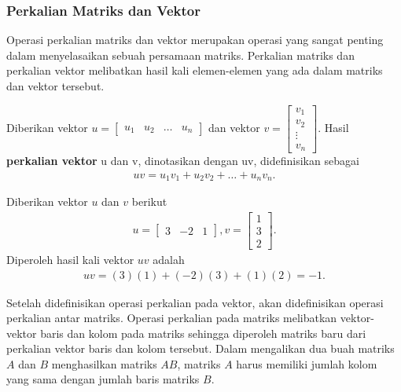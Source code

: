 \subsubsection{Perkalian Matriks dan Vektor}
Operasi perkalian matriks dan vektor merupakan operasi yang sangat penting dalam menyelasaikan sebuah persamaan matriks. Perkalian matriks dan perkalian vektor melibatkan hasil kali elemen-elemen yang ada dalam matriks dan vektor tersebut.
\begin{definisi}
    Diberikan vektor $u=\begin{bmatrix}
            u_1&u_2&\dots&u_n
        \end{bmatrix}$ dan vektor $v=\begin{bmatrix}
            v_1\\
            v_2\\
            \vdots\\
            v_n
        \end{bmatrix}$. Hasil \textbf{perkalian vektor} u dan v, dinotasikan dengan uv, didefinisikan sebagai
    \begin{align*}
        uv=u_1v_1 + u_2v_2 + \dots + u_nv_n.
    \end{align*}
\end{definisi}
\begin{contoh}
Diberikan vektor $u$ dan $v$ berikut
\begin{align*}
    u=\begin{bmatrix}
            3&-2&1
        \end{bmatrix},
        v=\begin{bmatrix}
            1\\
            3\\
            2
        \end{bmatrix}.
\end{align*}
Diperoleh hasil kali vektor $uv$ adalah
\begin{align*}
    uv=(3)(1) + (-2)(3) + (1)(2)=-1.
\end{align*}
\end{contoh}
Setelah didefinisikan operasi perkalian pada vektor, akan didefinisikan operasi perkalian antar matriks. Operasi perkalian pada matriks melibatkan vektor-vektor baris dan kolom pada matriks sehingga diperoleh matriks baru dari perkalian vektor baris dan kolom tersebut. Dalam mengalikan dua buah matriks $A$ dan $B$ menghasilkan matriks $AB$, matriks $A$ harus memiliki jumlah kolom yang sama dengan jumlah baris matriks $B$.
